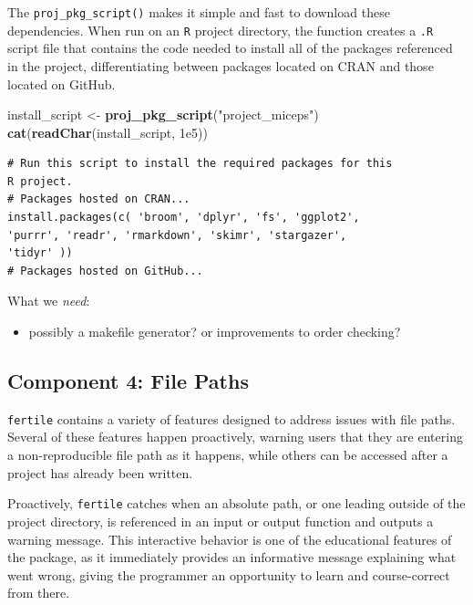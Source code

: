 \documentclass[12pt,twoside]{reedthesis}
\newenvironment{Shaded}{\begin{snugshade}}{\end{snugshade}}
\newcommand{\KeywordTok}[1]{\textcolor[rgb]{0.13,0.29,0.53}{\textbf{#1}}}
\newcommand{\FloatTok}[1]{\textcolor[rgb]{0.00,0.00,0.81}{#1}}
\newcommand{\StringTok}[1]{\textcolor[rgb]{0.31,0.60,0.02}{#1}}
\newcommand{\NormalTok}[1]{#1}
\providecommand{\tightlist}{%
  \setlength{\itemsep}{0pt}\setlength{\parskip}{0pt}}
\begin{document}
The \texttt{proj\_pkg\_script()} makes it simple and fast to download
these dependencies. When run on an \texttt{R} project directory, the
function creates a \texttt{.R} script file that contains the code needed
to install all of the packages referenced in the project,
differentiating between packages located on CRAN and those located on
GitHub.

\footnotesize
\begin{Shaded}
\begin{Highlighting}[]
\NormalTok{install_script <-}\StringTok{ }\KeywordTok{proj_pkg_script}\NormalTok{(}\StringTok{"project_miceps"}\NormalTok{)}
\KeywordTok{cat}\NormalTok{(}\KeywordTok{readChar}\NormalTok{(install_script, }\FloatTok{1e5}\NormalTok{))}
\end{Highlighting}
\end{Shaded}
\begin{verbatim}
# Run this script to install the required packages for this
R project.
# Packages hosted on CRAN...
install.packages(c( 'broom', 'dplyr', 'fs', 'ggplot2',
'purrr', 'readr', 'rmarkdown', 'skimr', 'stargazer',
'tidyr' ))
# Packages hosted on GitHub...
\end{verbatim}
\normalsize

What we \emph{need}:
\begin{itemize}
\tightlist
\item
  possibly a makefile generator? or improvements to order checking?
\end{itemize}
\subsection{Component 4: File Paths}\label{component-4-file-paths}

\texttt{fertile} contains a variety of features designed to address
issues with file paths. Several of these features happen proactively,
warning users that they are entering a non-reproducible file path as it
happens, while others can be accessed after a project has already been
written.

Proactively, \texttt{fertile} catches when an absolute path, or one
leading outside of the project directory, is referenced in an input or
output function and outputs a warning message. This interactive behavior
is one of the educational features of the package, as it immediately
provides an informative message explaining what went wrong, giving the
programmer an opportunity to learn and course-correct from there.
\end{document}
